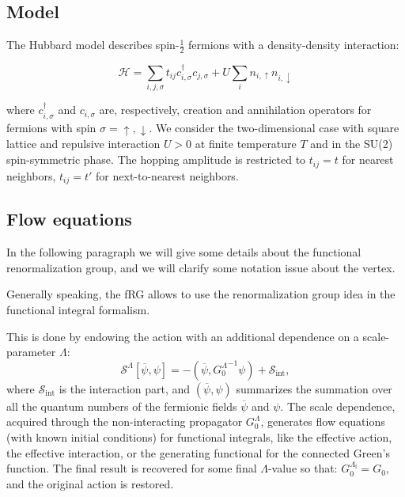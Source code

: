 
\subsection{Model}

The Hubbard model\cite{Hubbard1963} describes spin-$\frac{1}{2}$ fermions with a density-density interaction:

\begin{equation}
\mathcal{H} = \sum_{i,j,\sigma} t_{ij} c^{\dagger}_{i,\sigma} c_{j,\sigma} + U \sum_{i} n_{i,\uparrow} n_{i,\downarrow}
\end{equation}

where $c^{\dagger}_{i,\sigma}$ and $c_{i,\sigma}$ are, respectively, creation and annihilation operators 
for fermions with spin $\sigma=\uparrow,\downarrow$. We consider the two-dimensional case with square lattice and repulsive interaction $U>0$ at finite temperature $T$ and in the SU(2) spin-symmetric phase. The hopping amplitude is restricted to $t_{ij} = t$ for nearest neighbors, $t_{ij}=t'$ for next-to-nearest neighbors.


\subsection{Flow equations}


In the following paragraph we will give some details about the functional renormalization group\cite{Metzner2012,Platt2013}, and we will clarify some notation issue about the vertex. 

Generally speaking, the fRG allows to use the renormalization group idea in the functional integral formalism. 

This is done by endowing the action with an additional dependence on a scale-parameter $\Lambda$:\cite{Metzner2012,Platt2013} 
\begin{equation}
 \mathcal{S}^\Lambda[\overline\psi,\psi]=
-(\overline\psi,{G_0^\Lambda}^{-1}\psi)+\mathcal{S}_{\mathrm{int}},  
\end{equation} 
where $\mathcal{S}_{\mathrm{int}}$ is the interaction part, and $(\overline\psi,\psi)$ summarizes the summation over all the quantum numbers of the fermionic fields  $\overline \psi$ and $\psi$. 
The scale dependence, acquired through the non-interacting propagator $G_0^\Lambda$, generates flow equations\cite{Wetterich1993} (with known initial conditions) for functional integrals, like the effective action, the effective interaction, or the generating functional for the connected Green's function. 
The final result is recovered for some final $\Lambda$-value so that: $G_0^{\Lambda_\mathrm{f}} = G_0$, and the original action is restored.  

